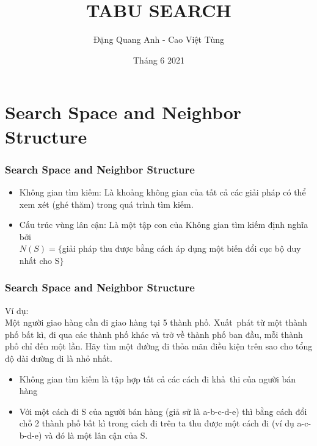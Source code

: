 \documentclass[12pt]{beamer}
\begin{document}
	\author{Đặng Quang Anh - Cao Việt Tùng}
	\title{TABU SEARCH}
	\date{Tháng 6 2021}
	\maketitle
	
	
	\section{Search Space and Neighbor Structure}
	\begin{frame}
		\frametitle{Search Space and Neighbor Structure}
		\begin{itemize}
			\item Không gian tìm kiếm: Là khoảng không gian của tất cả các giải pháp có thể xem xét (ghé thăm) trong quá trình tìm kiếm.
			\item Cấu trúc vùng lân cận: Là một tập con của Không gian tìm kiếm định nghĩa bởi\\
			$N(S) = \{ $giải pháp thu được bằng cách áp dụng một biến đổi cục bộ duy nhất cho S$ \}$
		\end{itemize}
	\end{frame}
	
	\begin{frame}
		\frametitle{Search Space and Neighbor Structure}
		Ví dụ:\\
		Một người giao hàng cần đi giao hàng tại 5 thành phố. Xuất~phát từ một thành phố bất kì, đi qua các thành phố khác  và trở về thành phố ban đầu, mỗi thành phố chỉ đến một lần. Hãy tìm một đường đi thỏa mãn điều kiện trên sao cho tổng độ dài đường đi là nhỏ nhất.\\
		\begin{itemize}
			\item Không gian tìm kiếm là tập hợp tất cả các cách đi khả~thi của người bán hàng
			\item Với một cách đi S của người bán hàng (giả sử là a-b-c-d-e) thì bằng cách đổi chỗ 2 thành phố bất kì trong cách đi trên ta thu được một cách đi (ví dụ a-c-b-d-e) và đó là một lân cận của S.
		\end{itemize}
	\end{frame}
	
\end{document}
